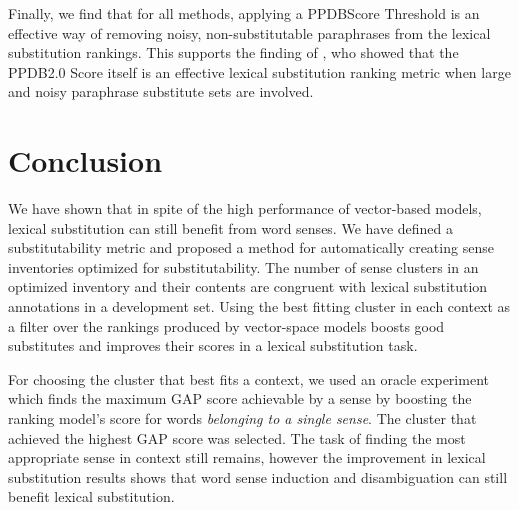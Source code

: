 \documentclass[11pt]{article}
\begin{document}
Finally, we find that for all methods, applying a PPDBScore Threshold is an effective way of removing noisy, non-substitutable paraphrases from the lexical substitution rankings. This supports the finding of , who showed that the PPDB2.0 Score itself is an effective lexical substitution ranking metric when large and noisy paraphrase substitute sets are involved.



\section{Conclusion}

We have shown that in spite of the high performance of vector-based models, lexical substitution can still benefit from word senses. We have defined a substitutability metric and proposed a method for automatically creating sense inventories optimized for substitutability. The number of sense clusters in an optimized inventory and their contents are congruent with lexical substitution annotations in a development set. Using the best fitting cluster in each context as a filter over the rankings produced by vector-space models boosts good substitutes and improves their scores in a lexical substitution task. 

For choosing the cluster that best fits a context, we used an oracle experiment which finds the maximum GAP score achievable by a sense by boosting the ranking model's score for words \textit{belonging to a single sense}. The cluster that achieved the highest GAP score was selected. The task of finding the most appropriate sense in context still remains, however the improvement in lexical substitution results shows that word sense induction and disambiguation can still benefit lexical substitution.   




\end{document}
